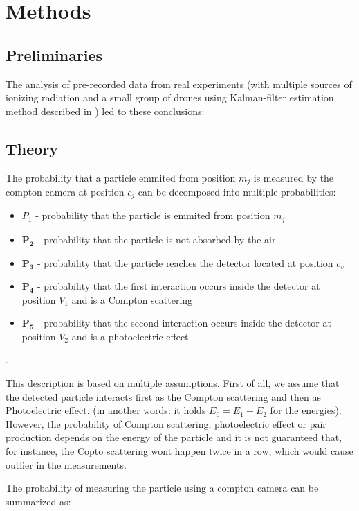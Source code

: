 
\chapter{Methods}


\section{Preliminaries}
The analysis of pre-recorded data from real experiments (with multiple sources of ionizing radiation and a small group of drones using Kalman-filter estimation method described in \cite{Baca}) led to these conclusions:

\section{Theory}
The probability that a particle emmited from position $m_{j}$ is measured by the compton camera at position $c_{j}$ can be decomposed into multiple probabilities:
\begin{itemize}
  \item $P_{1}$ - probability that the particle is emmited from position $m_{j}$
  \item $\mathbf{P_{2}}$ - probability that the particle is not absorbed by the air
  \item $\mathbf{P_{3}}$ - probability that the particle reaches the detector located at position $c_{v}$
	\item $\mathbf{P_{4}}$ - probability that the first interaction occurs inside the detector at position $V_{1}$ and is a Compton scattering
  \item $\mathbf{P_{5}}$ - probability that the second interaction occurs inside the detector at position $V_{2}$ and is a photoelectric effect
\end{itemize}.

This description is based on multiple assumptions.
First of all, we assume that the detected particle interacts first as the Compton scattering and then as Photoelectric effect. 
(in another words: it holds $E_{0} = E_{1} + E_{2}$ for the energies).
However, the probability of Compton scattering, photoelectric effect or pair production depends on the energy of the particle and it is not guaranteed that, for instance, the Copto scattering wont happen twice in a row, which would cause outlier in the measurements.

The probability of measuring the particle using a compton camera can be summarized as:

